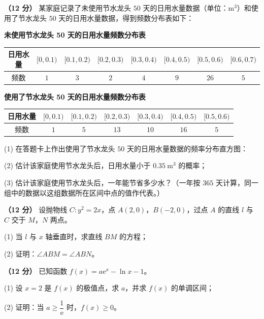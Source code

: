 \begin{question}
\textbf{（12 分）} 某家庭记录了未使用节水龙头 $50$ 天的日用水量数据（单位：$\mathrm m^{3}$）和使用了节水龙头 $50$ 天的日用水量数据，得到频数分布表如下：

\textbf{未使用节水龙头 50 天的日用水量频数分布表}

\begin{center}
\begingroup\setlength{\tabcolsep}{4pt}
\begin{tabular}{cccccccc}
\toprule
日用水量 & $[0,0.1)$ & $[0.1,0.2)$ & $[0.2,0.3)$ & $[0.3,0.4)$ & $[0.4,0.5)$ & $[0.5,0.6)$ & $[0.6,0.7)$ \\
\midrule
频数 & $1$ & $3$ & $2$ & $4$ & $9$ & $26$ & $5$ \\
\bottomrule
\end{tabular}
\endgroup
\end{center}

\textbf{使用了节水龙头 50 天的日用水量频数分布表}

\begin{center}
\begin{tabular}{ccccccc}
\toprule
日用水量 & $[0,0.1)$ & $[0.1,0.2)$ & $[0.2,0.3)$ & $[0.3,0.4)$ & $[0.4,0.5)$ & $[0.5,0.6)$ \\
\midrule
频数 & $1$ & $5$ & $13$ & $10$ & $16$ & $5$ \\
\bottomrule
\end{tabular}
\end{center}

\Needspace{0.4\textheight}

  (1) 在答题卡上作出使用了节水龙头 $50$ 天的日用水量数据的频率分布直方图：
\nopagebreak[4]
\begin{center}\end{center}
\nopagebreak[4]
  (2) 估计该家庭使用节水龙头后，日用水量小于 $0.35\ \mathrm m^{3}$ 的概率；

  (3) 估计该家庭使用节水龙头后，一年能节省多少水？（一年按 $365$ 天计算，同一组中的数据以这组数据所在区间中点的值作代表。）

\end{question}
\begin{question}
\textbf{（12 分）} 设抛物线 $C:y^{2}=2x$，点 $A(2,0)$，$B(-2,0)$，过点 $A$ 的直线 $l$ 与 $C$ 交于 $M$，$N$ 两点。

  (1) 当 $l$ 与 $x$ 轴垂直时，求直线 $BM$ 的方程；

  (2) 证明：$\angle ABM=\angle ABN$。

\end{question}
\begin{question}
\textbf{（12 分）} 已知函数 $f(x)=a\mathrm e^{x}-\ln x-1$。

  (1) 设 $x=2$ 是 $f(x)$ 的极值点，求 $a$，并求 $f(x)$ 的单调区间；

  (2) 证明：当 $a\ge\dfrac1{\mathrm e}$ 时，$f(x)\ge0$。

\par\medskip

\end{question}

